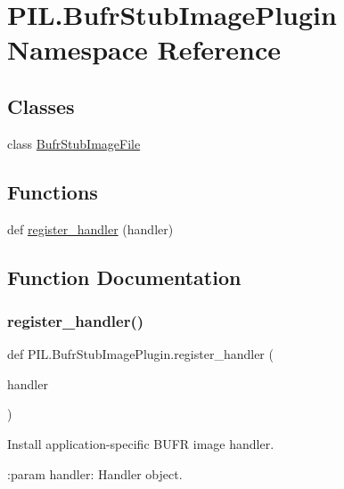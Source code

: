 \hypertarget{namespacePIL_1_1BufrStubImagePlugin}{}\section{P\+I\+L.\+Bufr\+Stub\+Image\+Plugin Namespace Reference}
\label{namespacePIL_1_1BufrStubImagePlugin}
\subsection*{Classes}
\begin{DoxyCompactItemize}
\item 
class \hyperlink{classPIL_1_1BufrStubImagePlugin_1_1BufrStubImageFile}{Bufr\+Stub\+Image\+File}
\end{DoxyCompactItemize}
\subsection*{Functions}
\begin{DoxyCompactItemize}
\item 
def \hyperlink{namespacePIL_1_1BufrStubImagePlugin_a8f866c0c4c662f0de0d0738843d29ab0}{register\+\_\+handler} (handler)
\end{DoxyCompactItemize}


\subsection{Function Documentation}
\mbox{\label{namespacePIL_1_1BufrStubImagePlugin_a8f866c0c4c662f0de0d0738843d29ab0}} 
\subsubsection{\texorpdfstring{register\+\_\+handler()}{register\_handler()}}
{\footnotesize\ttfamily def P\+I\+L.\+Bufr\+Stub\+Image\+Plugin.\+register\+\_\+handler (\begin{DoxyParamCaption}\item[{}]{handler }\end{DoxyParamCaption})}

\begin{DoxyVerb}Install application-specific BUFR image handler.

:param handler: Handler object.
\end{DoxyVerb}
 